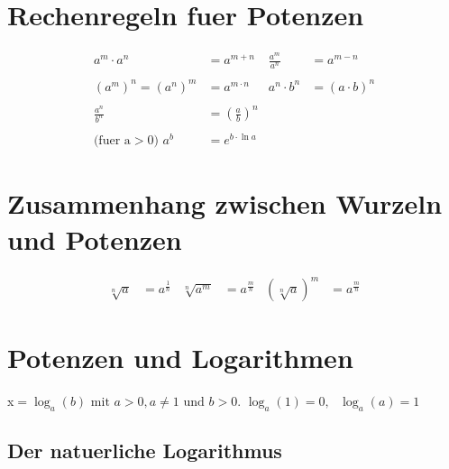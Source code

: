 	\section{Rechenregeln fuer Potenzen}
				
			
			\begin{align*}
				a^m \cdot a^n &= a^{m+n}	& \frac{a^m}{a^n} &= a^{m-n}	\\ \\
				\left( a^m \right)^n = \left( a^n \right)^m &= a^{m \cdot n} & a^n \cdot b^n &= \left( a \cdot b \right)^n	\\ \\
				\frac{a^n}{b^n} &= \left( \frac{a}{b} \right)^n	\\ \\
				\text{(fuer a} > \text{0) } a^b &= e^{b \cdot \ln a}
			\end{align*}
	
	\vspace{10mm}
	\section{Zusammenhang zwischen Wurzeln und Potenzen}
		
	
			
			
			
			\begin{align*}
				\sqrt[n]{a} &= a^{\frac{1}{n}} & \sqrt[n]{a^m} &= a^{\frac{m}{n}} & \left(\sqrt[n]{a}\right)^m &= a^{ \frac{m}{n}}
			\end{align*}
	
	\newpage
	\section{Potenzen und Logarithmen}
	
	
			x\(=\log_a \left(b\right) \text{ mit } a > 0, a \neq 1 \text{ und } b > 0 \text{.}\)
			\newline
			\(\log_a \left(1\right) = 0, \text{ } \log_a \left( a \right) = 1\)
				
	\vspace{10mm}
	\subsection{Der natuerliche Logarithmus}
	

